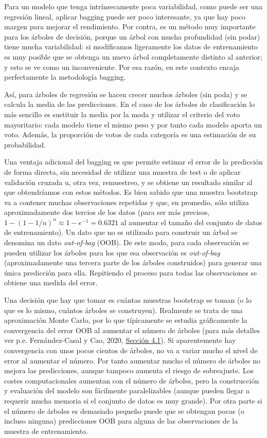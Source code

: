 \documentclass[
]{book}
\theoremstyle{break}
\theoremstyle{definition}
\theoremstyle{definition}
\theoremstyle{definition}
\theoremstyle{remark}
\begin{document}
Para un modelo que tenga intrínsecamente poca variabilidad, como puede ser una regresión lineal, aplicar bagging puede ser poco interesante, ya que hay poco margen para mejorar el rendimiento.
Por contra, es un método muy importante para los árboles de decisión, porque un árbol con mucha profundidad (sin podar) tiene mucha variabilidad: si modificamos ligeramente los datos de entrenamiento es muy posible que se obtenga un nuevo árbol completamente distinto al anterior; y esto se ve como un inconveniente.
Por esa razón, en este contexto encaja perfectamente la metodología bagging.

Así, para árboles de regresión se hacen crecer muchos árboles (sin poda) y se calcula la media de las predicciones.
En el caso de los árboles de clasificación lo más sencillo es sustituir la media por la moda y utilizar el criterio del voto mayoritario: cada modelo tiene el mismo peso y por tanto cada modelo aporta un voto.
Además, la proporción de votos de cada categoría es una estimación de su probabilidad.

Una ventaja adicional del bagging es que permite estimar el error de la predicción de forma directa, sin necesidad de utilizar una muestra de test o de aplicar validación cruzada u, otra vez, remuestreo, y se obtiene un resultado similar al que obtendríamos con estos métodos.
Es bien sabido que una muestra bootstrap va a contener muchas observaciones repetidas y que, en promedio, sólo utiliza aproximadamente dos tercios de los datos (para ser más precisos, \(1 - (1 - 1/n)^n \approx 1 - e^{-1} = 0.6321\) al aumentar el tamaño del conjunto de datos de entrenamiento).
Un dato que no es utilizado para construir un árbol se denomina un dato \emph{out-of-bag} (OOB).
De este modo, para cada observación se pueden utilizar los árboles para los que esa observación es \emph{out-of-bag} (aproximadamente una tercera parte de los árboles construidos) para generar una única predicción para ella.
Repitiendo el proceso para todas las observaciones se obtiene una medida del error.

Una decisión que hay que tomar es cuántas muestras bootstrap se toman (o lo que es lo mismo, cuántos árboles se construyen).
Realmente se trata de una aproximación Monte Carlo, por lo que típicamente se estudia gráficamente la convergencia del error OOB al aumentar el número de árboles (para más detalles ver p.e. Fernández-Casal y Cao, 2020, \href{https://rubenfcasal.github.io/simbook/convergencia.html}{Sección 4.1}).
Si aparentemente hay convergencia con unos pocos cientos de árboles, no va a variar mucho el nivel de error al aumentar el número.
Por tanto aumentar mucho el número de árboles no mejora las predicciones, aunque tampoco aumenta el riesgo de sobreajuste.
Los costes computacionales aumentan con el número de árboles, pero la construcción y evaluación del modelo son fácilmente paralelizables (aunque pueden llegar a requerir mucha memoria si el conjunto de datos es muy grande).
Por otra parte si el número de árboles es demasiado pequeño puede que se obtengan pocas (o incluso ninguna) predicciones OOB para alguna de las observaciones de la muestra de entrenamiento.
\end{document}
